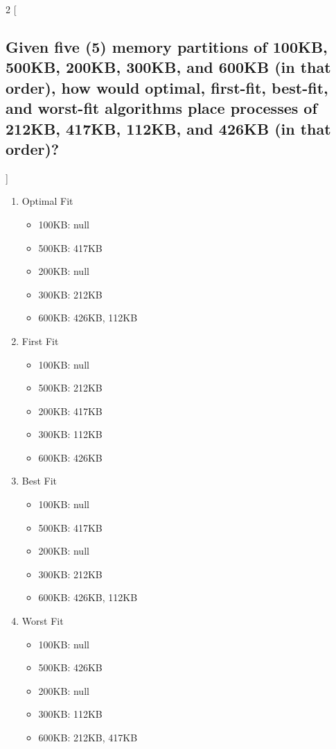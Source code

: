 \documentclass[12pt]{article}
\begin{document}
   \begin{multicols}{2}
   [
   \subsection*{Given	five	(5)	memory	partitions	of	100KB,	500KB,	200KB,	300KB,	and	600KB	(in	that	
   order),	how	would	optimal,	first-fit,	best-fit,	and	worst-fit	algorithms	place	processes	
   of	212KB,	417KB,	112KB,	and	426KB	(in	that	order)?}
   ]
   
   
   \begin{enumerate}
   \item Optimal Fit
       \begin{itemize}
       \item 100KB: null
       \item 500KB: 417KB
       \item 200KB: null 
       \item 300KB: 212KB
       \item 600KB: 426KB, 112KB
       \end{itemize}
   \item First Fit
       \begin{itemize}
       \item 100KB: null
       \item 500KB: 212KB
       \item 200KB: 417KB
       \item 300KB: 112KB
       \item 600KB: 426KB
       \end{itemize}
   \item Best Fit
       \begin{itemize}
       \item 100KB: null
       \item 500KB: 417KB
       \item 200KB: null
       \item 300KB: 212KB
       \item 600KB: 426KB, 112KB
       \end{itemize}
   \item Worst Fit
       \begin{itemize}
       \item 100KB: null
       \item 500KB: 426KB
       \item 200KB: null
       \item 300KB: 112KB
       \item 600KB: 212KB, 417KB
       \end{itemize}
   \end{enumerate}
   
   
   \end{multicols}
    
   
\end{document}
